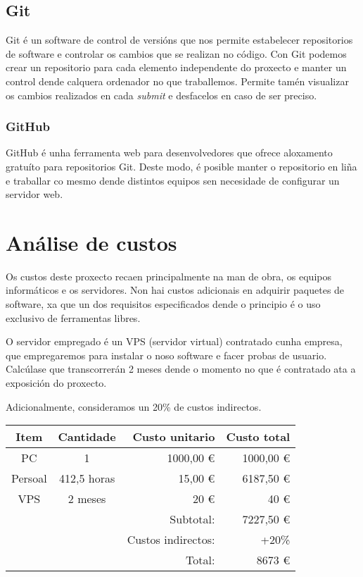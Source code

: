\subsection{Git}
Git \cite{git} é un software de control de versións que nos permite estabelecer
repositorios de software e controlar os cambios que se realizan no código. Con
Git podemos crear un repositorio para cada elemento independente do proxecto e
manter un control dende calquera ordenador no que traballemos. Permite tamén
visualizar os cambios realizados en cada {\it submit} e desfacelos en caso de
ser preciso.
\subsubsection{GitHub}
GitHub é unha ferramenta web para desenvolvedores que ofrece aloxamento gratuíto
para repositorios Git. Deste modo, é posible manter o repositorio en liña e
traballar co mesmo dende distintos equipos sen necesidade de configurar un
servidor web.

\section{Análise de custos}
Os custos deste proxecto recaen principalmente na man de obra, os equipos
informáticos e os servidores. Non hai custos adicionais en adquirir paquetes de
software, xa que un dos requisitos especificados dende o principio é o uso
exclusivo de ferramentas libres.
\par
O servidor empregado é un VPS (servidor virtual) contratado cunha empresa, que
empregaremos para instalar o noso software e facer probas de usuario.
Calcúlase que transcorrerán 2 meses dende o momento no que é contratado ata a
exposición do proxecto.
\par
Adicionalmente, consideramos un 20\% de custos indirectos.

\begin{tabular} { | c c r | r | }
\hline
Item & Cantidade & Custo unitario & Custo total \\
\hline
PC & 1 & 1000,00 \euro{} & 1000,00 \euro{} \\
\hline
Persoal & 412,5 horas & 15,00 \euro{} & 6187,50 \euro{} \\
\hline
VPS & 2 meses & 20 \euro{} & 40 \euro{} \\
\hline
& & Subtotal: & 7227,50 \euro{} \\
\hline
&& Custos indirectos: & +20\% \\
\hline
&& Total: & 8673 \euro{} \\
\hline
\end{tabular}